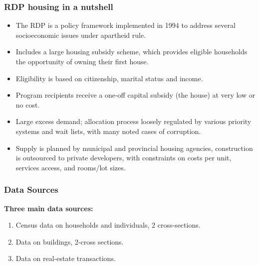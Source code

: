 \documentclass[aspectratio=149]{beamer}
\begin{document}

\begin{frame}
\frametitle{RDP housing in a nutshell }
  \begin{itemize}
    \item The RDP is a policy framework implemented in 1994 to address several socioeconomic issues under apartheid rule.
    \item Includes a large housing subsidy scheme, which provides eligible households the opportunity of owning their first house.
    \item Eligibility is based on citizenship, marital status and income.
    \item Program recipients receive a one-off capital subsidy (the house) at very low or no cost.
    \item Large excess demand; allocation process loosely regulated by various priority systems and wait lists, with many noted cases of corruption.
    \item Supply is planned by municipal and provincial housing agencies, construction is outsourced to private developers, with constraints on costs per unit, services access, and rooms/lot sizes.
  \end{itemize}



\end{frame}


\begin{frame}
\frametitle{Data Sources}
\vspace{-1em}
{\bf Three main data sources: }

\vspace{1em}

\begin{enumerate}
  \item Census data on households and individuals, 2 cross-sections.
  \item Data on buildings, 2-cross sections.
  \item Data on real-estate transactions.
\end{enumerate}

\end{frame}

\end{document}
